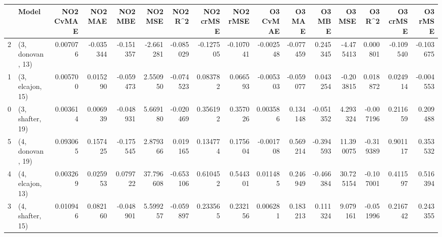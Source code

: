\begin{tabular}{llrrrrrrrrrrrrrr}
\toprule
{} &             Model &  NO2 CvMAE &   NO2 MAE &   NO2 MBE &    NO2 MSE &   NO2 R\textasciicircum2 &  NO2 crMSE &  NO2 rMSE &  O3 CvMAE &    O3 MAE &    O3 MBE &     O3 MSE &    O3 R\textasciicircum2 &  O3 crMSE &   O3 rMSE \\
\midrule
2 &  (3, donovan, 13) &   0.007076 & -0.035344 & -0.151357 &  -2.661281 & -0.085029 &  -0.127505 & -0.107041 & -0.002548 & -0.077459 &  0.245345 &  -4.475413 &  0.000801 & -0.109540 & -0.103675 \\
1 &  (3, elcajon, 15) &   0.005700 &  0.015290 & -0.059473 &   2.550950 & -0.074523 &   0.083782 &  0.066593 & -0.005303 & -0.059077 &  0.043254 &  -0.203815 &  0.018872 &  0.024914 & -0.004553 \\
0 &  (3, shafter, 19) &   0.003614 &  0.006939 & -0.048931 &   5.669180 & -0.020469 &   0.356192 &  0.357026 &  0.003586 &  0.134148 & -0.051352 &   4.293324 & -0.007196 &  0.211659 &  0.209488 \\
5 &  (4, donovan, 19) &   0.093065 &  0.157425 & -0.175545 &   2.879366 &  0.019165 &   0.134774 &  0.175604 & -0.001708 &  0.569214 & -0.394593 &  11.390075 & -0.319389 &  0.901117 &  0.353532 \\
4 &  (4, elcajon, 13) &   0.003269 &  0.025953 &  0.079722 &  37.796608 & -0.653106 &   0.610452 &  0.544301 &  0.011485 &  0.246949 & -0.466384 &  30.725154 & -0.107001 &  0.411597 &  0.516394 \\
3 &  (4, shafter, 15) &   0.010946 &  0.082160 & -0.048901 &   5.599257 & -0.059897 &   0.233565 &  0.232156 &  0.006281 &  0.183213 &  0.111324 &   9.079161 & -0.051996 &  0.216742 &  0.243355 \\
\bottomrule
\end{tabular}
